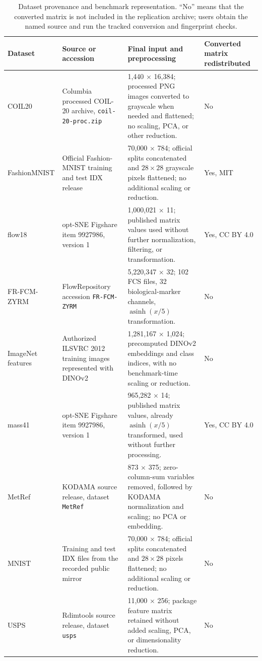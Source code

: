 \documentclass[11pt]{article}
\newcommand{\code}[1]{\texttt{#1}}
\newcommand{\pkg}[1]{\textsf{#1}}
\begin{document}
\begin{table}[H]
\centering
\scriptsize

\setlength{\tabcolsep}{3pt}
\begin{tabularx}{\textwidth}{@{}p{}p{}X p{}@{}}
\toprule
Dataset & Source or accession & Final input and preprocessing & Converted matrix redistributed \\
\midrule
COIL20 & Columbia processed COIL-20 archive, \code{coil-20-proc.zip} \citep{Nene1996} &
1,440 $\times$ 16,384; processed PNG images converted to grayscale when needed and flattened; no scaling, PCA, or other reduction. & No \\
FashionMNIST & Official Fashion-MNIST training and test IDX release \citep{Xiao2017} &
70,000 $\times$ 784; official splits concatenated and $28\times28$ grayscale pixels flattened; no additional scaling or reduction. & Yes, MIT \\
flow18 & opt-SNE Figshare item 9927986, version 1 \citep{Belkina2019} &
1,000,021 $\times$ 11; published matrix values used without further normalization, filtering, or transformation. & Yes, CC BY 4.0 \\
FR-FCM-ZYRM & FlowRepository accession \code{FR-FCM-ZYRM} \citep{VanUnen2017} &
5,220,347 $\times$ 32; 102 FCS files, 32 biological-marker channels, $\operatorname{asinh}(x/5)$ transformation. & No \\
ImageNet features & Authorized ILSVRC 2012 training images represented with DINOv2 \citep{Russakovsky2015,Oquab2024} &
1,281,167 $\times$ 1,024; precomputed DINOv2 embeddings and class indices, with no benchmark-time scaling or reduction. & No \\
mass41 & opt-SNE Figshare item 9927986, version 1 \citep{Belkina2019} &
965,282 $\times$ 14; published matrix values, already $\operatorname{asinh}(x/5)$ transformed, used without further processing. & Yes, CC BY 4.0 \\
MetRef & \pkg{KODAMA} source release, dataset \code{MetRef} \citep{Cacciatore2014} &
873 $\times$ 375; zero-column-sum variables removed, followed by KODAMA normalization and scaling; no PCA or embedding. & No \\
MNIST & Training and test IDX files from the recorded public mirror \citep{LeCun1998} &
70,000 $\times$ 784; official splits concatenated and $28\times28$ pixels flattened; no additional scaling or reduction. & No \\
USPS & \pkg{Rdimtools} source release, dataset \code{usps}
\citep{YouShung2022,Hull1994} &
11,000 $\times$ 256; package feature matrix retained without added scaling, PCA, or dimensionality reduction. & No \\
\bottomrule
\end{tabularx}
\caption{Dataset provenance and benchmark representation. ``No'' means that
the converted matrix is not included in the replication archive; users obtain
the named source and run the tracked conversion and fingerprint checks.}
\label{tab:dataset-provenance}
\end{table}
\end{document}
